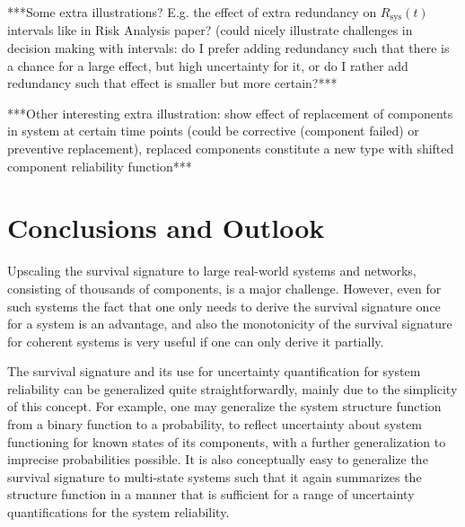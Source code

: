\documentclass[12pt, a4paper]{elsarticle}
\newcommand{\Rsys}{R_\text{sys}}
\begin{document}


***Some extra illustrations? E.g. the effect of extra redundancy on $\Rsys(t)$ intervals like in Risk Analysis paper?
(could nicely illustrate challenges in decision making with intervals:
do I prefer adding redundancy such that there is a chance for a large effect, but high uncertainty for it,
or do I rather add redundancy such that effect is smaller but more certain?***

***Other interesting extra illustration:
show effect of replacement of components in system at certain time points
(could be corrective (component failed) or preventive replacement),
replaced components constitute a new type with shifted component reliability function***


\section{Conclusions and Outlook}

Upscaling the survival signature to large real-world systems and networks, consisting of thousands of components, is a major challenge.
However, even for such systems the fact that one only needs to derive the survival signature once for a system is an advantage,
and also the monotonicity of the survival signature for coherent systems is very useful if one can only derive it partially.  

The survival signature and its use for uncertainty quantification for system
reliability can be generalized quite straightforwardly, mainly due to the simplicity of this concept.
For example, one may generalize the system structure function from a binary function to a probability, %
to reflect uncertainty about system functioning for known states of its components, with a further
generalization to imprecise probabilities possible. It is also conceptually easy to generalize the
survival signature to multi-state systems such that it again summarizes the structure function
in a manner that is sufficient for a range of uncertainty quantifications for the system reliability. 
\end{document}

